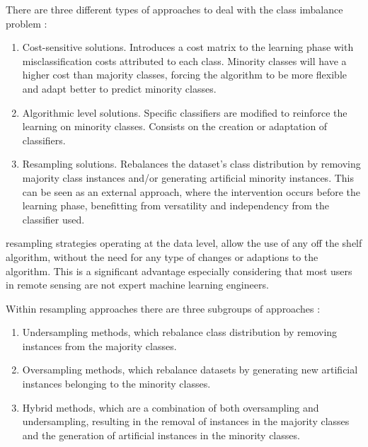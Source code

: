 \documentclass[remotesensing,article,submit,moreauthors,pdftex]{Definitions/mdpi}
\begin{document}
There are three different types of approaches to deal with the class imbalance
problem \cite{Fernandez2013,Kaur2019}:

\begin{enumerate}
    \item Cost-sensitive solutions. Introduces a cost matrix to the learning
        phase with misclassification costs attributed to each class. Minority
        classes will have a higher cost than majority classes, forcing the
        algorithm to be more flexible and adapt better to predict minority
        classes.
    \item Algorithmic level solutions. Specific classifiers are modified to
        reinforce the learning on minority classes. Consists on the creation or
        adaptation of classifiers.
    \item Resampling solutions. Rebalances the dataset's class distribution by
        removing majority class instances and/or generating artificial minority
        instances. This can be seen as an external approach, where the
        intervention occurs before the learning phase, benefitting from
        versatility and independency from the classifier used.
\end{enumerate}

 resampling strategies
 operating at
the data level,  allow the use of any
off the shelf algorithm, without the need for any type of changes or adaptions
to the algorithm.  This is a significant advantage especially considering that
most users in remote sensing are not expert machine learning engineers. 

Within resampling approaches there are three subgroups of approaches
\cite{Fernandez2013,Kaur2019,Luengo2020}:

\begin{enumerate}
    \item Undersampling methods, which rebalance class distribution by removing
        instances from the majority classes.
    \item Oversampling methods, which rebalance datasets by generating new
        artificial instances belonging to the minority classes.
    \item Hybrid methods, which are a combination of both oversampling and
        undersampling, resulting in the removal of instances in the majority
        classes and the generation of artificial instances in the minority
        classes.
\end{enumerate}
\end{document}
